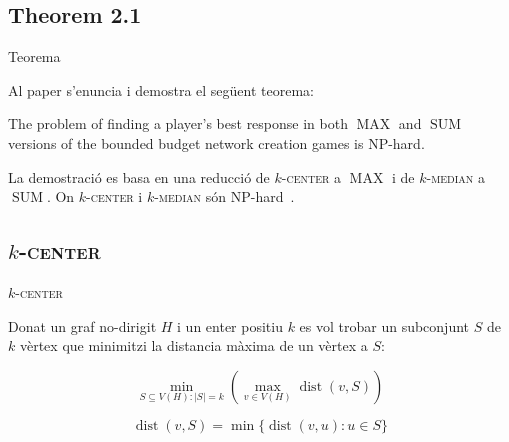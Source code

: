 \documentclass[aspectratio=169]{beamer}
\DeclareMathOperator{\dist}{dist}
\DeclareMathOperator{\SUM}{SUM}
\DeclareMathOperator{\MAX}{MAX}
\newcommand{\kcenter}{\texorpdfstring{$k$}{k}-\textsc{center}\xspace}
\newcommand{\kmedian}{\texorpdfstring{$k$}{k}-\textsc{median}\xspace}
\begin{document}
\subsection{Theorem 2.1}
\begin{frame}{Teorema}

    Al paper s'enuncia i demostra el següent teorema:
    
    \begin{theorem}
    The problem of finding a player's best response in both $\MAX$ and $\SUM$ versions of the bounded
    budget network creation games is NP-hard.
    \end{theorem}
    
    \vspace{2em}
    
    La demostració es basa en una reducció de \kcenter a $\MAX$ i de \kmedian a $\SUM$.
    On \kcenter i \kmedian són 
    NP-hard~\cite{hsu_easy_1979,lin_e-approximations_1992,megiddo_complexity_1984}.
    
\end{frame}

\subsection{\kcenter}
\begin{frame}{\kcenter}

\begin{problem}[\kcenter]
Donat un graf no-dirigit $H$ i un enter positiu $k$ es vol trobar un subconjunt $S$ de $k$
vèrtex que minimitzi la distancia màxima de un vèrtex a $S$:

\begin{equation}
\min_{S \subseteq V(H):|S|=k} \left( \max_{v \in V(H)} \dist(v, S) \right)
\end{equation}
\end{problem}

\begin{equation}
    \dist(v, S) = \min \{ \dist(v, u) : u \in S \}
\end{equation}

\end{frame}
\end{document}
